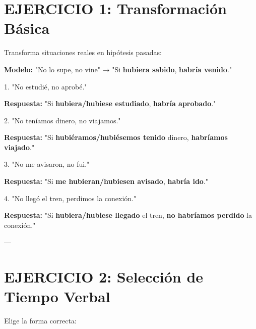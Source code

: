 \documentclass[a4paper,11pt]{article}
\begin{document}
\vspace{0.2cm}

\section{EJERCICIO 1: Transformación Básica}

\vspace{0.2cm}

Transforma situaciones reales en hipótesis pasadas:

\vspace{0.2cm}

\textbf{Modelo:} "No lo supe, no vine" → "Si \textbf{hubiera sabido}, \textbf{habría venido}."

\vspace{0.2cm}

1. "No estudié, no aprobé."

\textbf{Respuesta:} "Si \textbf{hubiera/hubiese estudiado}, \textbf{habría aprobado}."

\vspace{0.2cm}

2. "No teníamos dinero, no viajamos."

\textbf{Respuesta:} "Si \textbf{hubiéramos/hubiésemos tenido} dinero, \textbf{habríamos viajado}."

\vspace{0.2cm}

3. "No me avisaron, no fui."

\textbf{Respuesta:} "Si \textbf{me hubieran/hubiesen avisado}, \textbf{habría ido}."

\vspace{0.2cm}

4. "No llegó el tren, perdimos la conexión."

\textbf{Respuesta:} "Si \textbf{hubiera/hubiese llegado} el tren, \textbf{no habríamos perdido} la conexión."

\vspace{0.2cm}

---

\vspace{0.2cm}

\section{EJERCICIO 2: Selección de Tiempo Verbal}

\vspace{0.2cm}

Elige la forma correcta:
\end{document}
